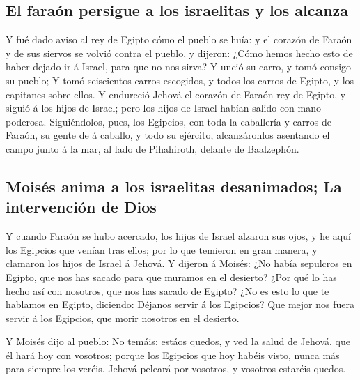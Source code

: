 \hypertarget{el-farauxf3n-persigue-a-los-israelitas-y-los-alcanza}{%
\subsection{El faraón persigue a los israelitas y los
alcanza}\label{el-farauxf3n-persigue-a-los-israelitas-y-los-alcanza}}

 Y fué dado aviso al rey de Egipto cómo el pueblo se huía:
y el corazón de Faraón y de sus siervos se volvió contra el pueblo, y
dijeron: ¿Cómo hemos hecho esto de haber dejado ir á Israel, para que no
nos sirva?  Y unció su carro, y tomó consigo su pueblo;
 Y tomó seiscientos carros escogidos, y todos los carros
de Egipto, y los capitanes sobre ellos.  Y endureció
Jehová el corazón de Faraón rey de Egipto, y siguió á los hijos de
Israel; pero los hijos de Israel habían salido con mano poderosa.
 Siguiéndolos, pues, los Egipcios, con toda la caballería
y carros de Faraón, su gente de á caballo, y todo su ejército,
alcanzáronlos asentando el campo junto á la mar, al lado de Pihahiroth,
delante de Baalzephón.

\hypertarget{moisuxe9s-anima-a-los-israelitas-desanimados-la-intervenciuxf3n-de-dios}{%
\subsection{Moisés anima a los israelitas desanimados; La intervención
de
Dios}\label{moisuxe9s-anima-a-los-israelitas-desanimados-la-intervenciuxf3n-de-dios}}

 Y cuando Faraón se hubo acercado, los hijos de Israel
alzaron sus ojos, y he aquí los Egipcios que venían tras ellos; por lo
que temieron en gran manera, y clamaron los hijos de Israel á Jehová.
 Y dijeron á Moisés: ¿No había sepulcros en Egipto, que
nos has sacado para que muramos en el desierto? ¿Por qué lo has hecho
así con nosotros, que nos has sacado de Egipto?  ¿No es
esto lo que te hablamos en Egipto, diciendo: Déjanos servir á los
Egipcios? Que mejor nos fuera servir á los Egipcios, que morir nosotros
en el desierto.

 Y Moisés dijo al pueblo: No temáis; estáos quedos, y ved
la salud de Jehová, que él hará hoy con vosotros; porque los Egipcios
que hoy habéis visto, nunca más para siempre los veréis. 
Jehová peleará por vosotros, y vosotros estaréis quedos.

